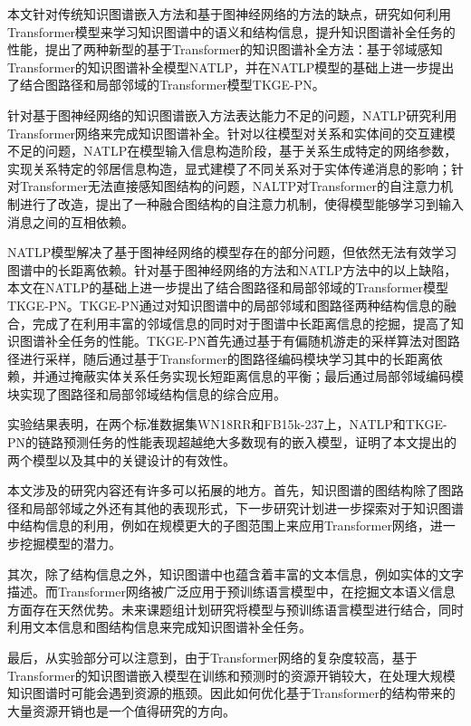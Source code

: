 \summary
本文针对传统知识图谱嵌入方法和基于图神经网络的方法的缺点，研究如何利用Transformer模型来学习知识图谱中的语义和结构信息，提升知识图谱补全任务的性能，提出了两种新型的基于Transformer的知识图谱补全方法：基于邻域感知Transformer的知识图谱补全模型NATLP，并在NATLP模型的基础上进一步提出了结合图路径和局部邻域的Transformer模型TKGE-PN。

针对基于图神经网络的知识图谱嵌入方法表达能力不足的问题，NATLP研究利用Transformer网络来完成知识图谱补全。针对以往模型对关系和实体间的交互建模不足的问题，NATLP在模型输入信息构造阶段，基于关系生成特定的网络参数，实现关系特定的邻居信息构造，显式建模了不同关系对于实体传递消息的影响；针对Transformer无法直接感知图结构的问题，NALTP对Transformer的自注意力机制进行了改造，提出了一种融合图结构的自注意力机制，使得模型能够学习到输入消息之间的互相依赖。

NATLP模型解决了基于图神经网络的模型存在的部分问题，但依然无法有效学习图谱中的长距离依赖。针对基于图神经网络的方法和NATLP方法中的以上缺陷，本文在NATLP的基础上进一步提出了结合图路径和局部邻域的Transformer模型TKGE-PN。TKGE-PN通过对知识图谱中的局部邻域和图路径两种结构信息的融合，完成了在利用丰富的邻域信息的同时对于图谱中长距离信息的挖掘，提高了知识图谱补全任务的性能。TKGE-PN首先通过基于有偏随机游走的采样算法对图路径进行采样，随后通过基于Transformer的图路径编码模块学习其中的长距离依赖，并通过掩蔽实体关系任务实现长短距离信息的平衡；最后通过局部邻域编码模块实现了图路径和局部邻域结构信息的综合应用。

实验结果表明，在两个标准数据集WN18RR和FB15k-237上，NATLP和TKGE-PN的链路预测任务的性能表现超越绝大多数现有的嵌入模型，证明了本文提出的两个模型以及其中的关键设计的有效性。


本文涉及的研究内容还有许多可以拓展的地方。首先，知识图谱的图结构除了图路径和局部邻域之外还有其他的表现形式，下一步研究计划进一步探索对于知识图谱中结构信息的利用，例如在规模更大的子图范围上来应用Transformer网络，进一步挖掘模型的潜力。

其次，除了结构信息之外，知识图谱中也蕴含着丰富的文本信息，例如实体的文字描述。而Transformer网络被广泛应用于预训练语言模型中，在挖掘文本语义信息方面存在天然优势。未来课题组计划研究将模型与预训练语言模型进行结合，同时利用文本信息和图结构信息来完成知识图谱补全任务。

最后，从实验部分可以注意到，由于Transformer网络的复杂度较高，基于Transformer的知识图谱嵌入模型在训练和预测时的资源开销较大，在处理大规模知识图谱时可能会遇到资源的瓶颈。因此如何优化基于Transformer的结构带来的大量资源开销也是一个值得研究的方向。

